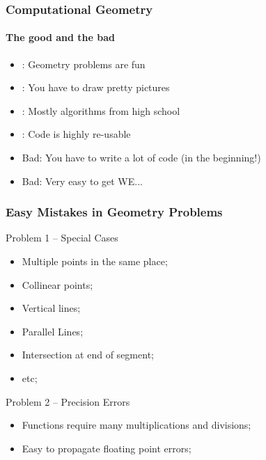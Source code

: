 \documentclass{beamer}
\begin{document}
\begin{frame}
  \frametitle{Computational Geometry}
  \framesubtitle{The good and the bad}

  \begin{itemize}
  \item {}: Geometry problems are fun
  \item {}: You have to draw pretty pictures
  \item {}: Mostly algorithms from high school
  \item {}: Code is highly re-usable

    \bigskip

  \item \alert{Bad}: You have to write a lot of code (in the beginning!)
  \item \alert{Bad}: Very easy to get WE...
  \end{itemize}
\end{frame}


\begin{frame}
  \frametitle{Easy Mistakes in Geometry Problems}

  {\small
    \begin{block}{Problem 1 -- Special Cases}
      \begin{itemize}
      \item Multiple points in the same place;
      \item Collinear points;
      \item Vertical lines;
      \item Parallel Lines;
      \item Intersection at end of segment;
      \item etc;
      \end{itemize}
    \end{block}

    \begin{block}{Problem 2 -- Precision Errors}
      \begin{itemize}
      \item Functions require many multiplications and divisions;
      \item Easy to propagate floating point errors;
      \end{itemize}
    \end{block}
  }
\end{frame}
\end{document}
